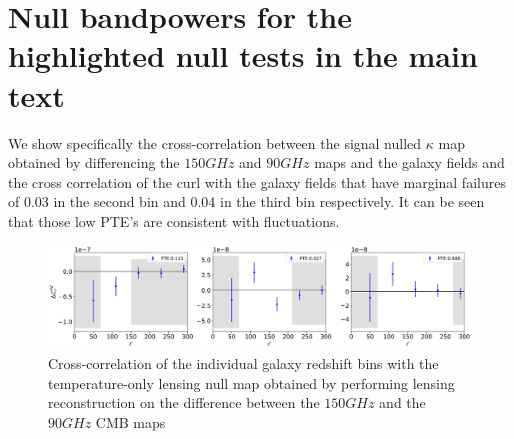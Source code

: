 \documentclass[twocolumn]{aastex631}
\begin{document}
{%





    
    

\section{Null bandpowers for the highlighted null tests in the main text} \label{appendix:null}
We show specifically the cross-correlation between the signal nulled $\kappa$ map obtained by differencing the $150\si{GHz}$ and $90\si{GHz}$ maps and the galaxy fields and the cross correlation of the curl with the galaxy fields that have marginal failures of 0.03 in the second bin and 0.04 in the third bin respectively. It can be seen that those low PTE's are consistent with fluctuations.

\begin{figure}
    \centering
\includegraphics[width=\linewidth]{figures/f150TT-f090TT.png}
    \caption{Cross-correlation of the individual galaxy redshift bins with the temperature-only lensing null map obtained by performing lensing reconstruction on the difference between the $150\si{GHz}$ and the $90\si{GHz}$  CMB maps}
    \label{fig:nullfog}
\end{figure}

}
\end{document}
